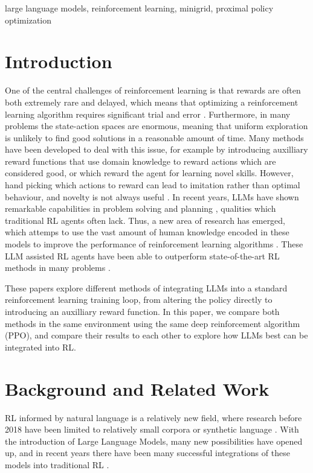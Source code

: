 \documentclass[conference]{IEEEtran}
\begin{document}
\begin{IEEEkeywords}
large language models, reinforcement learning, minigrid, proximal policy optimization
\end{IEEEkeywords}

\section{Introduction}

One of the central challenges of reinforcement learning is that rewards are often both extremely rare and delayed, which means that optimizing a reinforcement learning algorithm requires significant trial and error \cite[423]{brunton}. Furthermore, in many problems the state-action spaces are enormous, meaning that uniform exploration is unlikely to find good solutions in a reasonable amount of time. Many methods have been developed to deal with this issue, for example by introducing auxilliary reward functions that use domain knowledge to reward actions which are considered good, or which reward the agent for learning novel skills. However, hand picking which actions to reward can lead to imitation rather than optimal behaviour, and novelty is not always useful \cite[1]{ellm}. In recent years, LLMs have shown remarkable capabilities in problem solving and planning \cite{sparks}, qualities which traditional RL agents often lack. Thus, a new area of research has emerged, which attemps to use the vast amount of human knowledge encoded in these models to improve the performance of reinforcement learning algorithms \cite{survey}. These LLM assisted RL agents have been able to outperform state-of-the-art RL methods in many problems \cite{omni, ellm, idm}.

These papers explore different methods of integrating LLMs into a standard reinforcement learning training loop, from altering the policy directly to introducing an auxilliary reward function. In this paper, we compare both methods in the same environment using the same deep reinforcement algorithm (PPO), and compare their results to each other to explore how LLMs best can be integrated into RL.

\section{Background and Related Work}

RL informed by natural language is a relatively new field, where research before 2018 have been limited to relatively small corpora or synthetic language \cite[1]{survey}. With the introduction of Large Language Models, many new possibilities have opened up, and in recent years there have been many successful integrations of these models into traditional RL \cite{omni, ellm, idm}.
\end{document}
